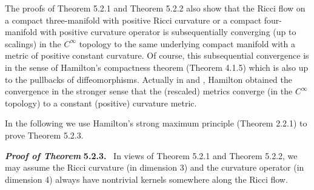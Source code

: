 \begin{remark}
  \label{rem:cz-differentiable-sphere-subsequential-convergence}

The proofs of Theorem 5.2.1 and Theorem 5.2.2 also show that the
Ricci flow on a compact three-manifold with positive Ricci
curvature or a compact four-manifold with positive curvature
operator is subsequentially converging (up to scalings) in the
$C^{\infty}$ topology to the same underlying compact manifold with
a metric of positive constant curvature. Of course, this
subsequential convergence is in the sense of Hamilton's
compactness theorem (Theorem 4.1.5) which is also up to the
pullbacks of diffeomorphisms. Actually in \cite{Ha82} and
\cite{Ha86}, Hamilton obtained the convergence in the stronger
sense that the (rescaled) metrics converge (in the $C^{\infty}$
topology) to a constant (positive) curvature metric.
\end{remark}

In the following we use Hamilton's strong maximum principle
(Theorem 2.2.1) to prove Theorem 5.2.3.

\medskip
{\bf \em Proof of Theorem} {\bf 5.2.3.} \ In views of Theorem
5.2.1 and Theorem 5.2.2, we may assume the Ricci curvature (in
dimension 3) and the curvature operator (in dimension 4) always
have nontrivial kernels somewhere along the Ricci flow.

